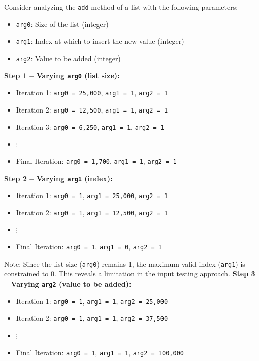 \begin{tcolorbox}[title=Example: Input Testing Process for \texttt{List.add(index, Element)}, colback=gray!5!white, colframe=gray!75!black, fonttitle=\bfseries, breakable]

Consider analyzing the \texttt{add} method of a list with the following parameters:
\begin{itemize}
    \item \texttt{arg0}: Size of the list (integer)
    \item \texttt{arg1}: Index at which to insert the new value (integer)
    \item \texttt{arg2}: Value to be added (integer)
\end{itemize}

\textbf{Step 1 – Varying \texttt{arg0} (list size):}

\begin{itemize}
    \item Iteration 1: \texttt{arg0 = 25,000}, \texttt{arg1 = 1}, \texttt{arg2 = 1}
    \item Iteration 2: \texttt{arg0 = 12,500}, \texttt{arg1 = 1}, \texttt{arg2 = 1}
    \item Iteration 3: \texttt{arg0 = 6,250}, \texttt{arg1 = 1}, \texttt{arg2 = 1}
    \item $\vdots$
    \item Final Iteration: \texttt{arg0 = 1,700}, \texttt{arg1 = 1}, \texttt{arg2 = 1}
\end{itemize}


\textbf{Step 2 – Varying \texttt{arg1} (index):}

\begin{itemize}
    \item Iteration 1: \texttt{arg0 = 1}, \texttt{arg1 = 25,000}, \texttt{arg2 = 1}
    \item Iteration 2: \texttt{arg0 = 1}, \texttt{arg1 = 12,500}, \texttt{arg2 = 1}
    \item $\vdots$
    \item Final Iteration: \texttt{arg0 = 1}, \texttt{arg1 = 0}, \texttt{arg2 = 1}
\end{itemize}

{Note: Since the list size (\texttt{arg0}) remains 1, the maximum valid index (\texttt{arg1}) is constrained to 0. This reveals a limitation in the input testing approach.}
\textbf{Step 3 – Varying \texttt{arg2} (value to be added):}

\begin{itemize}
    \item Iteration 1: \texttt{arg0 = 1}, \texttt{arg1 = 1}, \texttt{arg2 = 25,000}
    \item Iteration 2: \texttt{arg0 = 1}, \texttt{arg1 = 1}, \texttt{arg2 = 37,500}
    \item $\vdots$
    \item Final Iteration: \texttt{arg0 = 1}, \texttt{arg1 = 1}, \texttt{arg2 = 100,000}
\end{itemize}


\end{tcolorbox}
